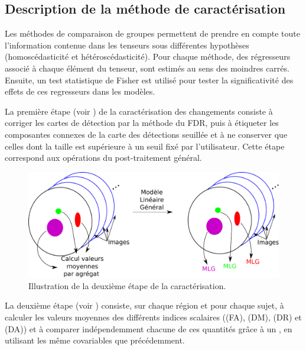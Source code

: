 \subsection{Description de la méthode de caractérisation}
Les méthodes de comparaison de groupes permettent de prendre en compte toute l'information contenue dans les tenseurs sous différentes hypothèses
(homoscédasticité et hétéroscédasticité).
Pour chaque méthode, des régresseurs associé à chaque élément du tenseur, sont estimés au sens des moindres carrés.
Ensuite, un test statistique de Fisher est utilisé pour tester la significativité des effets de ces regresseurs dans les modèles.

La première étape (voir ) de la caractérisation des changements consiste à corriger les cartes de détection par la méthode du FDR,
puis à étiqueter les composantes connexes de la carte des détections seuillée 
et à ne conserver que celles dont la taille est supérieure à un seuil fixé par l'utilisateur. 
Cette étape correspond aux opérations du post-traitement général.

\begin{figure}[ht]
    \centering
    \includegraphics[scale=0.6]{Images/etape_carac_2.pdf}
    \caption{\label{etape_carac_2}Illustration de la deuxième étape de la caractérisation.}
\end{figure}
La deuxième étape (voir ) consiste, sur chaque région et pour chaque sujet, à calculer les valeurs
moyennes des différents indices scalaires (\fa (FA), \md (DM), \dr (DR) et \da (DA)) et à comparer indépendemment chacune de ces quantités grâce à
un \mlg, en utilisant les même covariables que précédemment.


